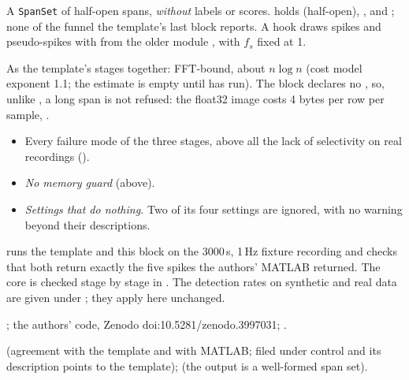 A \texttt{SpanSet} of half-open spans, \emph{without} labels or scores.  holds
 (half-open), ,  and ;
none of the funnel the template's last block reports. A  hook draws spikes and
pseudo-spikes with  from the older module
, with $f_s$ fixed at 1.

As the template's stages together: FFT-bound, about $n\log n$ (cost model exponent 1.1; the
estimate is empty until  has run). The block declares no
, so, unlike , a long span is
not refused: the float32 image costs 4 bytes per row per sample, .

\begin{itemize}
\item Every failure mode of the three stages, above all the lack of selectivity on real
  recordings ().
\item \emph{No memory guard} (above).
\item \emph{Settings that do nothing.} Two of its four settings are ignored, with no warning
  beyond their descriptions.
\end{itemize}

 runs the template and this block on the 3000\,s, 1\,Hz
fixture recording and checks that both return exactly the five spikes the authors' MATLAB
returned. The core is checked stage by stage in . The
detection rates on synthetic and real data are given under
; they apply here unchanged.

\citet{dehshibi2021electrical}; the authors' code, Zenodo doi:10.5281/zenodo.3997031;
.

 (agreement with the template and with MATLAB; filed under
control and its description points to the template); 
(the output is a well-formed span set).
